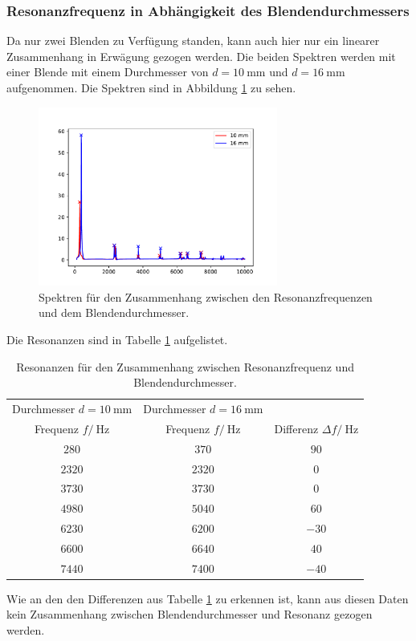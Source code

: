 \subsubsection{Resonanzfrequenz in Abhängigkeit des Blendendurchmessers}
Da nur zwei Blenden zu Verfügung standen, kann auch hier nur ein linearer Zusammenhang in Erwägung gezogen werden.
Die beiden Spektren werden mit einer Blende mit einem Durchmesser von $d=\SI{10}{\milli\meter}$ und
$d=\SI{16}{\milli\meter}$ aufgenommen. Die Spektren sind in Abbildung \ref{fig:Spektren_WM_Blende} zu sehen.
\FloatBarrier
\begin{figure}
    \centering
    \includegraphics[width = 0.7\textwidth , keepaspectratio]{figure/WM_Blenden.pdf}
    \caption{Spektren für den Zusammenhang zwischen den Resonanzfrequenzen und dem Blendendurchmesser.}
    \label{fig:Spektren_WM_Blende}
\end{figure}
\FloatBarrier
Die Resonanzen sind in Tabelle \ref{tab:Resonanz_WM_Blenden} aufgelistet.
\FloatBarrier
\begin{table}
    \centering
    \caption{Resonanzen für den Zusammenhang zwischen Resonanzfrequenz und Blendendurchmesser.}
    \label{tab:Resonanz_WM_Blenden}
    \begin{tabular}{c c c}
        \toprule
        Durchmesser $d=\SI{10}{\milli\meter}$ &Durchmesser $d=\SI{16}{\milli\meter}$& \\
        Frequenz $f /\SI{}{\hertz}$& Frequenz $f /\SI{}{\hertz}$&Differenz $\Delta f /\SI{}{\hertz}$\\
        \midrule
        $\num{280}$ &$\num{370}$ &$\num{90}$\\
        $\num{2320}$&$\num{2320}$&$\num{0}$\\
        $\num{3730}$&$\num{3730}$&$\num{0}$\\
        $\num{4980}$&$\num{5040}$&$\num{60}$\\
        $\num{6230}$&$\num{6200}$&$\num{-30}$\\
        $\num{6600}$&$\num{6640}$&$\num{40}$\\
        $\num{7440}$&$\num{7400}$&$\num{-40}$\\
        \bottomrule
    \end{tabular}
\end{table}
\FloatBarrier
Wie an den den Differenzen aus Tabelle \ref{tab:Resonanz_WM_Blenden} zu erkennen ist, kann aus diesen Daten kein 
Zusammenhang zwischen Blendendurchmesser und Resonanz gezogen werden.

